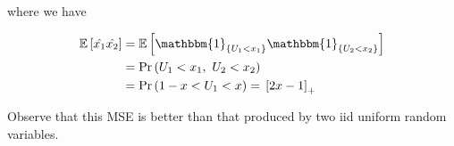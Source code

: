 \documentclass[twoside]{article}
\begin{document}
where we have

\begin{align}
    \mean{\hat{x_1}\hat{x_2}} &= \mean{\mathbbm{1}_{\cbrak{U_1 < x_1}}\mathbbm{1}_{\cbrak{U_2 < x_2}}} \\
                              &= \pr{U_1 < x_1,\ U_2 < x_2} \\
                              &= \pr{1 - x < U_1 < x} = \sbrak{2x-1}_{+}
                              \label{eq:mean-prod}
\end{align}

Observe that this MSE is better than that produced by two iid uniform random
variables.
\end{document}
